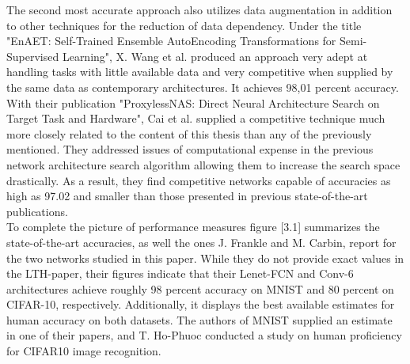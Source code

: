 The second most accurate approach also utilizes data augmentation in addition to other techniques for the reduction of data dependency. Under the title "EnAET: Self-Trained Ensemble AutoEncoding Transformations for Semi-Supervised Learning", X. Wang et al. produced an approach very adept at handling tasks with little available data and very competitive when supplied by the same data as contemporary architectures. It achieves 98,01 percent accuracy.\cite{EnAET}\\
With their publication "ProxylessNAS: Direct Neural Architecture Search on Target Task and Hardware", Cai et al. supplied a competitive technique much more closely related to the content of this thesis than any of the previously mentioned. They addressed issues of computational expense in the previous network architecture search algorithm allowing them to increase the search space drastically. As a result, they find competitive networks capable of accuracies as high as 97.02 and smaller than those presented in previous state-of-the-art publications.\cite{Direct-NAS}\\ 
To complete the picture of performance measures figure [3.1] summarizes the state-of-the-art accuracies, as well the ones J. Frankle and M. Carbin, report for the two networks studied in this paper.   
While they do not provide exact values in the LTH-paper, their figures indicate that their Lenet-FCN and Conv-6 architectures achieve roughly 98 percent accuracy on MNIST and 80 percent on CIFAR-10, respectively. \cite{LTH} Additionally, it displays the best available estimates for human accuracy on both datasets. The authors of MNIST supplied an estimate in one of their papers, and T. Ho-Phuoc conducted a study on human proficiency for CIFAR10 image recognition.\cite{MNIST-Human}\cite{CIFAR10-Human}


